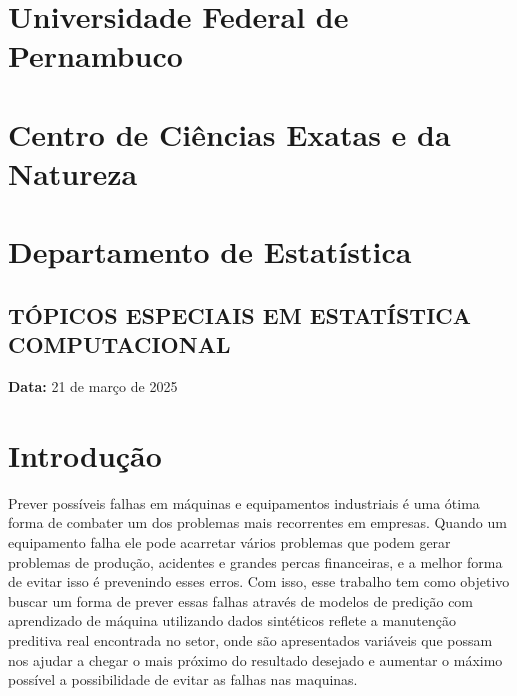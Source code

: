\documentclass[
  oneclumn]{article}
\author{}
\date{2024-10-31}
\begin{document}
\section{Universidade Federal de
Pernambuco}\label{universidade-federal-de-pernambuco}

\vspace{-.4cm}

\section{Centro de Ciências Exatas e da
Natureza}\label{centro-de-ciuxeancias-exatas-e-da-natureza}

\vspace{-.4cm}

\section{Departamento de
Estatística}\label{departamento-de-estatuxedstica}

\vspace{.5cm}

\subsection{TÓPICOS ESPECIAIS EM ESTATÍSTICA
COMPUTACIONAL}\label{tuxf3picos-especiais-em-estatuxedstica-computacional}

\vspace{.5cm}

\textbf{Data:} 21 de março de 2025

\vspace{.5cm}

\section{Introdução}\label{introduuxe7uxe3o}

Prever possíveis falhas em máquinas e equipamentos industriais é uma
ótima forma de combater um dos problemas mais recorrentes em empresas.
Quando um equipamento falha ele pode acarretar vários problemas que
podem gerar problemas de produção, acidentes e grandes percas
financeiras, e a melhor forma de evitar isso é prevenindo esses erros.
Com isso, esse trabalho tem como objetivo buscar um forma de prever
essas falhas através de modelos de predição com aprendizado de máquina
utilizando dados sintéticos reflete a manutenção preditiva real
encontrada no setor, onde são apresentados variáveis que possam nos
ajudar a chegar o mais próximo do resultado desejado e aumentar o máximo
possível a possibilidade de evitar as falhas nas maquinas.
\end{document}
